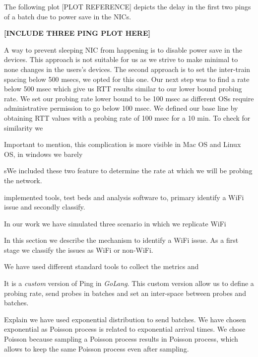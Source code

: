 The following plot [PLOT REFERENCE] depicts the delay in the first two pings of a batch due to power save in the NICs.


\textbf{[INCLUDE THREE PING PLOT HERE]}

A way to prevent sleeping NIC from happening is to disable power save in the devices. This approach is not suitable for us as we strive to make minimal to none changes in the users's devices. The second approach is to set the inter-train spacing below 500 msecs, we opted for this one. Our next step was to find a rate below 500 msec which give us RTT results similar to our lower bound probing rate. We set our probing rate lower bound to be 100 msec as different OSs require administrative permission to go below 100 msec. We defined our base line by obtaining RTT values with a probing rate of 100 msec for a 10 min. To check for similarity we 







Important to mention, this complication is more visible in Mac OS and Linux OS, in windows we barely 









 sWe included these two feature to determine the rate at which we will be probing the network.


implemented tools, test beds and analysis software to, primary identify a WiFi issue and secondly classify.


In our work we have simulated three scenario in which we replicate WiFi 


In this section we describe the mechanism to identify a WiFi issue. As a first stage we classify the issues as WiFi or non-WiFi.

We have used different standard tools to collect the metrics and 

It is a \emph{custom} version of Ping in \emph{GoLang}. This custom version allow us to define a probing rate, send probes in batches and set an inter-space between probes and batches.

Explain we have used exponential distribution to send batches. We have chosen exponential as Poisson process is related to exponential arrival times. We chose Poisson because sampling a Poisson process results in Poisson process, which allows to keep the same Poisson process even after sampling.

